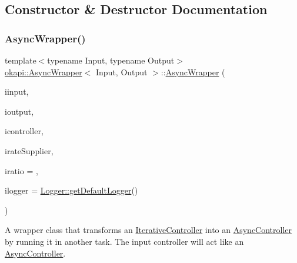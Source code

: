 \subsection{Constructor \& Destructor Documentation}
\mbox{\label{classokapi_1_1AsyncWrapper_adbbf06146d19a3fd5747f6ddd8bc084e}} 
\subsubsection{\texorpdfstring{AsyncWrapper()}{AsyncWrapper()}\hspace{0.1cm}{\footnotesize\ttfamily [1/2]}}
{\footnotesize\ttfamily template$<$typename Input, typename Output$>$ \\
\mbox{\hyperlink{classokapi_1_1AsyncWrapper}{okapi\+::\+Async\+Wrapper}}$<$ Input, Output $>$\+::\mbox{\hyperlink{classokapi_1_1AsyncWrapper}{Async\+Wrapper}} (\begin{DoxyParamCaption}\item[{const std\+::shared\+\_\+ptr$<$ \mbox{\hyperlink{classokapi_1_1ControllerInput}{Controller\+Input}}$<$ Input $>$$>$ \&}]{iinput,  }\item[{const std\+::shared\+\_\+ptr$<$ \mbox{\hyperlink{classokapi_1_1ControllerOutput}{Controller\+Output}}$<$ Output $>$$>$ \&}]{ioutput,  }\item[{std\+::unique\+\_\+ptr$<$ \mbox{\hyperlink{classokapi_1_1IterativeController}{Iterative\+Controller}}$<$ Input, Output $>$$>$}]{icontroller,  }\item[{const \mbox{\hyperlink{classokapi_1_1Supplier}{Supplier}}$<$ std\+::unique\+\_\+ptr$<$ \mbox{\hyperlink{classokapi_1_1AbstractRate}{Abstract\+Rate}} $>$$>$ \&}]{irate\+Supplier,  }\item[{const double}]{iratio = {},  }\item[{const std\+::shared\+\_\+ptr$<$ \mbox{\hyperlink{classokapi_1_1Logger}{Logger}} $>$ \&}]{ilogger = {\ttfamily \mbox{\hyperlink{classokapi_1_1Logger_a5053cf778b4b55acba788a3797dc96d2}{Logger\+::get\+Default\+Logger}}()} }\end{DoxyParamCaption})\hspace{0.3cm}{\ttfamily [inline]}}

A wrapper class that transforms an {\ttfamily \mbox{\hyperlink{classokapi_1_1IterativeController}{Iterative\+Controller}}} into an {\ttfamily \mbox{\hyperlink{classokapi_1_1AsyncController}{Async\+Controller}}} by running it in another task. The input controller will act like an {\ttfamily \mbox{\hyperlink{classokapi_1_1AsyncController}{Async\+Controller}}}.


